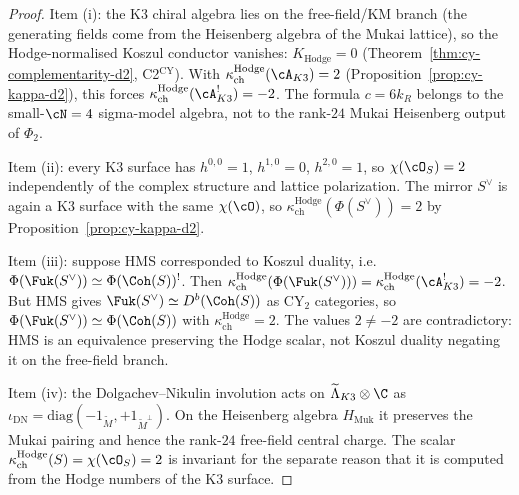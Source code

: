 \begin{proof}
Item (i): the K3 chiral algebra lies on the free-field/KM branch (the generating fields come from the Heisenberg algebra of the Mukai lattice), so the Hodge-normalised Koszul conductor vanishes: $K_{\mathrm{Hodge}} = 0$ (Theorem~\ref{thm:cy-complementarity-d2}, C2$^{\mathrm{CY}}$). With $\kappa_{\mathrm{ch}}^{\mathrm{Hodge}}(\cA_{K3}) = 2$ (Proposition~\ref{prop:cy-kappa-d2}), this forces $\kappa_{\mathrm{ch}}^{\mathrm{Hodge}}(\cA_{K3}^!) = -2$. The formula $c = 6k_R$ belongs to the small-$\cN=4$ sigma-model algebra, not to the rank-$24$ Mukai Heisenberg output of $\Phi_2$.

Item (ii): every K3 surface has $h^{0,0} = 1$, $h^{1,0} = 0$, $h^{2,0} = 1$, so $\chi(\cO_S) = 2$ independently of the complex structure and lattice polarization. The mirror $S^\vee$ is again a K3 surface with the same $\chi(\cO)$, so $\kappa_{\mathrm{ch}}^{\mathrm{Hodge}}(\Phi(S^\vee)) = 2$ by Proposition~\ref{prop:cy-kappa-d2}.

Item (iii): suppose HMS corresponded to Koszul duality, i.e.\ $\Phi(\Fuk(S^\vee)) \simeq \Phi(\Coh(S))^!$. Then $\kappa_{\mathrm{ch}}^{\mathrm{Hodge}}(\Phi(\Fuk(S^\vee))) = \kappa_{\mathrm{ch}}^{\mathrm{Hodge}}(\cA_{K3}^!) = -2$. But HMS gives $\Fuk(S^\vee) \simeq D^b(\Coh(S))$ as CY$_2$ categories, so $\Phi(\Fuk(S^\vee)) \simeq \Phi(\Coh(S))$ with $\kappa_{\mathrm{ch}}^{\mathrm{Hodge}} = 2$. The values $2 \neq -2$ are contradictory: HMS is an equivalence preserving the Hodge scalar, not Koszul duality negating it on the free-field branch.

Item (iv): the Dolgachev--Nikulin involution acts on $\widetilde{\Lambda}_{K3} \otimes \C$ as $\iota_{\mathrm{DN}} = \mathrm{diag}(-1_{\widetilde{M}}, +1_{\widetilde{M}^\perp})$. On the Heisenberg algebra $H_{\mathrm{Muk}}$ it preserves the Mukai pairing and hence the rank-$24$ free-field central charge. The scalar $\kappa_{\mathrm{ch}}^{\mathrm{Hodge}}(S) = \chi(\cO_S) = 2$ is invariant for the separate reason that it is computed from the Hodge numbers of the K3 surface.
\end{proof}

